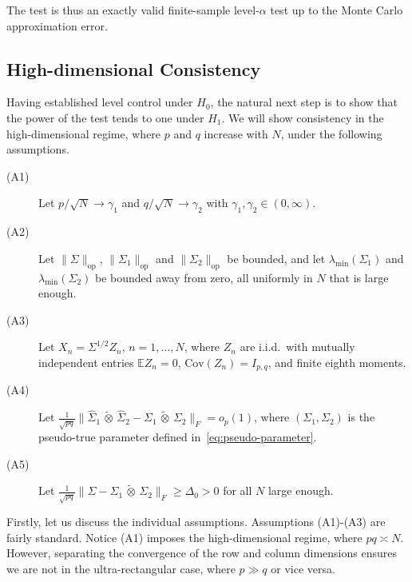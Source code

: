 \documentclass[12pt]{article}
\newcommand{\E}{\mathbb{E}}
\newcommand{\cov}{\mathrm{Cov}}
\newcommand{\ot}{\,\tilde\otimes\,}
\newcommand{\op}{\mathrm{op}}
\begin{document}
The test is thus an exactly valid finite-sample level-$\alpha$ test up to the Monte Carlo approximation error.

\subsection{High-dimensional Consistency}

Having established level control under $H_0$, the natural next step is to show that the power of the test tends to one under $H_1$. We will show consistency in the high-dimensional regime, where $p$ and $q$ increase with $N$, under the following assumptions.
\begin{description}
    \item[(A1)] Let $p/\sqrt{N} \to \gamma_1$ and $q/\sqrt{N} \to \gamma_2$ with $\gamma_1,\gamma_2 \in (0,\infty)$.
    \item[(A2)] Let $\|\Sigma\|_\op$, $\|\Sigma_1\|_\op$ and $\|\Sigma_2\|_\op$ be bounded, and let $\lambda_{\text{min}}(\Sigma_1)$ and $\lambda_{\text{min}}(\Sigma_2)$ be bounded away from zero, all uniformly in $N$ that is large enough.
    \item[(A3)] Let $X_n = \Sigma^{1/2}Z_n$, $n=1,\ldots,N$, where $Z_n$ are i.i.d.~with mutually independent entries $\E Z_n=0$, $\cov(Z_n)=I_{p,q}$, and finite eighth moments.
    \item[(A4)] Let $\frac{1}{\sqrt{pq}}\|\widehat{\Sigma}_1 \ot\widehat{\Sigma}_2 - \Sigma_1 \ot \Sigma_2 \|_F = o_p(1)$, where $(\Sigma_1,\Sigma_2)$ is the pseudo-true parameter defined in~\eqref{eq:pseudo-parameter}.
    \item[(A5)] Let $\frac{1}{\sqrt{pq}}\|\Sigma - \Sigma_1 \ot \Sigma_2 \|_F \geq \Delta_0 > 0$ for all $N$ large enough.
\end{description}
Firstly, let us discuss the individual assumptions. Assumptions (A1)-(A3) are fairly standard. Notice (A1) imposes the high-dimensional regime, where $pq \asymp N$. However, separating the convergence of the row and column dimensions ensures we are not in the ultra-rectangular case, where $p \gg q$ or vice versa.
\end{document}
